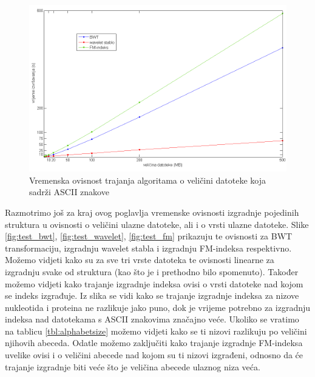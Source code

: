 \begin{figure}[h]
   \centering
       \includegraphics[width=\textwidth]{./pictures/test_ascii.png}
 \caption{Vremenska ovisnost trajanja algoritama o veličini datoteke koja sadrži ASCII znakove}
 \label{fig:test_ascii}
\end{figure}


Razmotrimo još za kraj ovog poglavlja vremenske ovisnosti izgradnje pojedinih struktura u ovisnosti o veličini ulazne datoteke, ali i o vrsti ulazne datoteke. Slike \ref{fig:test_bwt}, \ref{fig:test_wavelet}, \ref{fig:test_fm} prikazuju te ovisnosti za BWT transformaciju, izgradnju wavelet stabla i izgradnju FM-indeksa respektivno. Možemo vidjeti kako su za sve tri vrste datoteka te ovisnosti linearne za izgradnju svake od struktura (kao što je i prethodno bilo spomenuto). Također možemo vidjeti kako trajanje izgradnje indeksa ovisi o vrsti datoteke nad kojom se indeks izgrađuje. Iz slika se vidi kako se trajanje izgradnje indeksa za nizove nukleotida i proteina ne razlikuje jako puno, dok je vrijeme potrebno za izgradnju indeksa nad datotekama s ASCII znakovima značajno veće. Ukoliko se vratimo na tablicu \ref{tbl:alphabetsize} možemo vidjeti kako se ti nizovi razlikuju po veličini njihovih abeceda. Odatle možemo zaključiti kako trajanje izgradnje FM-indeksa uvelike ovisi i o veličini abecede nad kojom su ti nizovi izgrađeni, odnosno da će trajanje izgradnje biti veće što je veličina abecede ulaznog niza veća.


